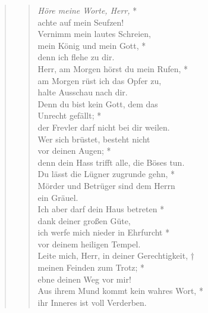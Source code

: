 \vspace{0.3cm}
\def\greinitialformat#1{{\fontsize{40}{40}\selectfont #1}}
\gresetfirstlineaboveinitial{\small \textcolor{red}{Ps 5}}{}
\setaboveinitialseparation{0.72mm}

\vspace{0.3cm}


\begin{quote}
\begin{verse}
 \textit{Höre meine Worte, Herr,} *\\ 
achte auf mein Seufzen!\\ 
\vin Vernimm mein lautes Schreien,\\ 
\vin mein König und mein Gott, *\\ 
\vin denn ich flehe zu dir.\\  
Herr, am Morgen hörst du mein Rufen, *\\ 
am Morgen rüst ich das Opfer zu, \\
halte Ausschau nach dir.\\ 
\vin Denn du bist kein Gott, dem das\\ 
\vin Unrecht gefällt; *\\ 
\vin der Frevler darf nicht bei dir weilen.\\  
Wer sich brüstet, besteht nicht\\
vor deinen Augen; *\\ 
denn dein Hass trifft alle, die Böses tun.\\ 
\vin Du lässt die Lügner zugrunde gehn, *\\ 
\vin Mörder und Betrüger sind dem Herrn\\ 
\vin ein Gräuel.\\ 
Ich aber darf dein Haus betreten *\\ 
dank deiner großen Güte,\\ 
\vin ich werfe mich nieder in Ehrfurcht *\\ 
\vin vor deinem heiligen Tempel.\\ 
Leite mich, Herr, in deiner Gerechtigkeit, †\\
meinen Feinden zum Trotz; *\\  
ebne deinen Weg vor mir!\\ 
\vin Aus ihrem Mund kommt kein wahres Wort, *\\ 
\vin ihr Inneres ist voll Verderben.\\  

\end{verse}
\end{quote}
